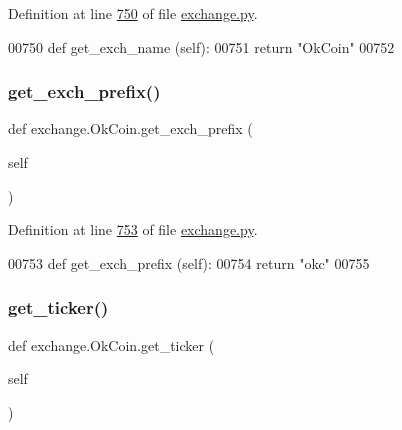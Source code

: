 Definition at line \hyperlink{exchange_8py_source_l00750}{750} of file \hyperlink{exchange_8py_source}{exchange.\+py}.


\begin{DoxyCode}
00750     \textcolor{keyword}{def }get\_exch\_name (self):
00751         \textcolor{keywordflow}{return} \textcolor{stringliteral}{"OkCoin"}
00752     
\end{DoxyCode}
\mbox{\label{classexchange_1_1_ok_coin_a0ea57ae94a5e07e9387f830c67ceeed1}} 
\subsubsection{\texorpdfstring{get\+\_\+exch\+\_\+prefix()}{get\_exch\_prefix()}}
{\footnotesize\ttfamily def exchange.\+Ok\+Coin.\+get\+\_\+exch\+\_\+prefix (\begin{DoxyParamCaption}\item[{}]{self }\end{DoxyParamCaption})}



Definition at line \hyperlink{exchange_8py_source_l00753}{753} of file \hyperlink{exchange_8py_source}{exchange.\+py}.


\begin{DoxyCode}
00753     \textcolor{keyword}{def }get\_exch\_prefix (self):
00754         \textcolor{keywordflow}{return} \textcolor{stringliteral}{"okc"}
00755         
\end{DoxyCode}
\mbox{\label{classexchange_1_1_ok_coin_a35425d16f4e0eb64677e32443fb4d91c}} 
\subsubsection{\texorpdfstring{get\+\_\+ticker()}{get\_ticker()}}
{\footnotesize\ttfamily def exchange.\+Ok\+Coin.\+get\+\_\+ticker (\begin{DoxyParamCaption}\item[{}]{self }\end{DoxyParamCaption})}



